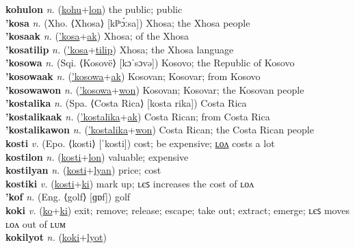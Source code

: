 \textbf{kohulon} \textit{n.} (\hyperref[kohu]{kohu}+\hyperref[lon]{lon})
the public; public \label{kohulon} \\
\textbf{'kosa} \textit{n.} (Xho. ⟨Xhosa⟩ [kǁʰɔ́ːsa])
Xhosa; the Xhosa people \label{'kosa} \\
\textbf{'kosaak} \textit{n.} (\hyperref['kosa]{'kosa}+\hyperref[ak]{ak})
Xhosa; of the Xhosa \label{'kosaak} \\
\textbf{'kosatilip} \textit{n.} (\hyperref['kosa]{'kosa}+\hyperref[tilip]{tilip})
Xhosa; the Xhosa language \label{'kosatilip} \\
\textbf{'kosowa} \textit{n.} (Sqi. ⟨Kosovë⟩ [kɔˈsɔvə])
Kosovo; the Republic of Kosovo \label{'kosowa} \\
\textbf{'kosowaak} \textit{n.} (\hyperref['kosowa]{'kosowa}+\hyperref[ak]{ak})
Kosovan; Kosovar; from Kosovo \label{'kosowaak} \\
\textbf{'kosowawon} \textit{n.} (\hyperref['kosowa]{'kosowa}+\hyperref[won]{won})
Kosovan; Kosovar; the Kosovan people \label{'kosowawon} \\
\textbf{'kostalika} \textit{n.} (Spa. ⟨Costa Rica⟩ [kosta rika])
Costa Rica \label{'kostalika} \\
\textbf{'kostalikaak} \textit{n.} (\hyperref['kostalika]{'kostalika}+\hyperref[ak]{ak})
Costa Rican; from Costa Rica \label{'kostalikaak} \\
\textbf{'kostalikawon} \textit{n.} (\hyperref['kostalika]{'kostalika}+\hyperref[won]{won})
Costa Rican; the Costa Rican people \label{'kostalikawon} \\
\textbf{kosti} \textit{v.} (Epo. ⟨kosti⟩ [ˈkosti])
cost; be expensive; \hyperref[kostilon]{ʟᴏᴧ} costs a lot \label{kosti} \\
\textbf{kostilon} \textit{n.} (\hyperref[kosti]{kosti}+\hyperref[lon]{lon})
valuable; expensive \label{kostilon} \\
\textbf{kostilyan} \textit{n.} (\hyperref[kosti]{kosti}+\hyperref[lyan]{lyan})
price; cost \label{kostilyan} \\
\textbf{kostiki} \textit{v.} (\hyperref[kosti]{kosti}+\hyperref[ki]{ki})
mark up; ʟєꜱ increases the cost of ʟᴏᴧ \label{kostiki} \\
\textbf{'kof} \textit{n.} (Eng. ⟨golf⟩ [ɡɒf])
golf \label{'kof} \\
\textbf{koki} \textit{v.} (\hyperref[ko]{ko}+\hyperref[ki]{ki})
exit; remove; release; escape; take out; extract; emerge; ʟєꜱ moves ʟᴏᴧ out of ʟᴜᴍ \label{koki} \\
\textbf{kokilyot} \textit{n.} (\hyperref[koki]{koki}+\hyperref[lyot]{lyot})
